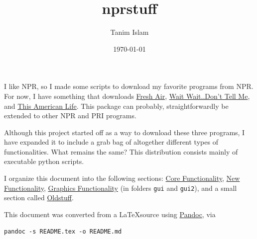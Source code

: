 \documentclass[]{article}
\title{nprstuff}
\date{\today}
\author{Tanim Islam}
\begin{document}
\maketitle

I like NPR, so I made some scripts to download my favorite programs from NPR. For now, I have something that downloads \href{http://www.npr.org/programs/fresh-air/}{Fresh Air}, \href{http://www.npr.org/programs/wait-wait-dont-tell-me/}{Wait Wait..Don't Tell Me}, and \href{http://www.thisamericanlife.org/}{This American Life}. This package can probably, straightforwardly be extended to other NPR and PRI programs.

Although this project started off as a way to download these three programs, I have expanded it to include a grab bag of altogether different types of functionalities. What remains the same? This distribution consists mainly of executable python scripts.

I organize this document into the following sections: \hyperref[sec:core_functionality]{Core Functionality}, \hyperref[sec:new_functionality]{New Functionality}, \hyperref[sec:graphics_functionality]{Graphics Functionality} (in folders {\verb|gui|} and {\verb|gui2|}), and a small section called \hyperref[sec:oldstuff]{Oldstuff}.

This document was converted from a \LaTeX source using \href{http://pandoc.org/index.html}{Pandoc}, via
\begin{verbatim}
pandoc -s README.tex -o README.md
\end{verbatim}
\end{document}
